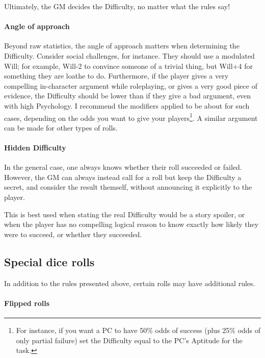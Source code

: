 \begin{rpg-examplebox}
	Ultimately, the GM decides the Difficulty, no matter what the rules say!
\end{rpg-examplebox}

\paragraph{Angle of approach}

Beyond raw statistics, the angle of approach matters when determining the Difficulty. Consider social challenges, for instance. They should use a modulated Will; for example, Will-2 to convince someone of a trivial thing, but Will+4 for something they are loathe to do. Furthermore, if the player gives a very compelling in-character argument while roleplaying, or gives a very good piece of evidence, the Difficulty should be lower than if they give a bad argument, even with high Psychology. I recommend the modifiers applied to be about  for such cases, depending on the odds you want to give your players\footnote{For instance, if you want a PC to have 50\% odds of success (plus 25\% odds of only partial failure) set the Difficulty equal to the PC's Aptitude for the task.}. A similar argument can be made for other types of rolls.


\paragraph{Hidden Difficulty} 

In the general case, one always knows whether their roll succeeded or failed. However, the GM can always instead call for a roll but keep the Difficulty a secret, and consider the result themself, without announcing it explicitly to the player. 

This is best used when stating the real Difficulty would be a story spoiler, or when the player has no compelling logical reason to know exactly how likely they were to succeed, or whether they succeeded.

\subsection{Special dice rolls} 

In addition to the rules presented above, certain rolls may have additional rules.


\paragraph{Flipped rolls} 


